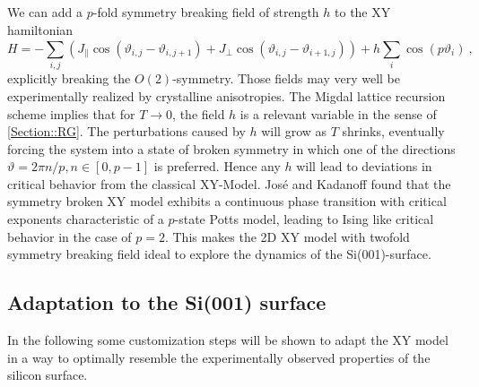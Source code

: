 		We can add a $p$-fold symmetry breaking field of strength $h$ to the XY hamiltonian
		\begin{equation} \label{Eq::XY-Hamilton-Field}
			H =- \sum_{i,j}^{} \left(J_\parallel  \cos \left(\vartheta_{i,j} - \vartheta_{i, j+1} \right) + J_\perp  \cos \left(\vartheta_{i,j} - \vartheta_{i+1, j} \right) \right)	+ h \sum_i \cos(p\vartheta_i) ~,
		\end{equation}
		explicitly breaking the $O(2)$-symmetry. Those fields may very well be experimentally realized by crystalline anisotropies. The Migdal lattice recursion scheme \cite{migdal1975phase} implies that for $T \rightarrow 0$, the field $h$ is a relevant variable in the sense of \autoref{Section::RG}. The perturbations caused by $h$ will grow as $T$ shrinks, eventually forcing the system into a state of broken symmetry in which one of the directions $\vartheta =	{2 \pi n }/{p}, n \in \left[0, p-1\right]$ is preferred. Hence any $h$ will lead to deviations in critical behavior from the classical XY-Model. José and Kadanoff \cite{jose1977renormalization} found that the symmetry broken XY model exhibits a continuous phase transition with critical exponents characteristic of a $p$-state Potts model, leading to Ising like critical behavior in the case of $p=2$. This makes the 2D XY model with twofold symmetry breaking field ideal to explore the dynamics of the Si(001)-surface.
		
		\subsection{Adaptation to the Si(001) surface} \label{Sec::XY-to-Silicon}
		In the following some customization steps will be shown to adapt the XY model in a way to optimally resemble the experimentally observed properties of the silicon surface. \\
		

